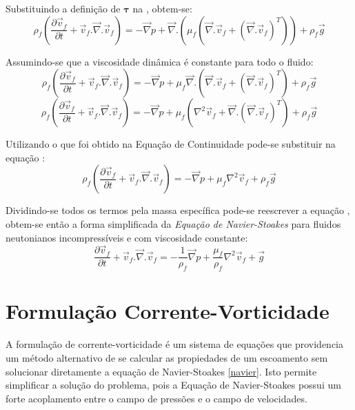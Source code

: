 Substituindo a definição de $\boldsymbol{\tau}$ na , obtem-se:
\begin{equation}
    \rho_f \left(
    	\dfrac{\partial \vec{v}_f}{\partial t} + 
    	\vec{v}_f.\vec{\nabla}.\vec{v}_f
	\right) =
    -\vec{\nabla}p +
    \vec{\nabla}.\left(\mu_f\left(\vec{\nabla}.\vec{v}_f + \left(\vec{\nabla}.\vec{v}_f \right)^T \right)\right) +
    \rho_f \vec{g}
\end{equation}

Assumindo-se que a viscosidade dinâmica é constante para todo o fluido:
\begin{equation}
    \rho_f \left(
    	\dfrac{\partial \vec{v}_f}{\partial t} + 
    	\vec{v}_f.\vec{\nabla}.\vec{v}_f
	\right) =
    -\vec{\nabla}p +
    \mu_f \vec{\nabla}.\left(\vec{\nabla}.\vec{v}_f + \left(\vec{\nabla}.\vec{v}_f \right)^T \right) +
    \rho_f \vec{g}
\end{equation}
\begin{equation}
    \rho_f \left(
    	\dfrac{\partial \vec{v}_f}{\partial t} + 
    	\vec{v}_f.\vec{\nabla}.\vec{v}_f
	\right) =
    -\vec{\nabla}p +
    \mu_f \left(\nabla^2\vec{v}_f + \vec{\nabla}.\left(\vec{\nabla}.\vec{v}_f \right)^T \right) +
    \rho_f \vec{g}
    \label{tau_last}
\end{equation}

Utilizando o que foi obtido na Equação de Continuidade  pode-se substituir na equação :
\begin{equation}
    \rho_f \left(
    	\dfrac{\partial \vec{v}_f}{\partial t} + 
    	\vec{v}_f.\vec{\nabla}.\vec{v}_f
	\right) =
    -\vec{\nabla}p +
    \mu_f \nabla^2\vec{v}_f +
    \rho_f \vec{g}
    \label{tau_simple}
\end{equation}

Dividindo-se todos os termos pela massa específica pode-se reescrever a equação , obtem-se então a forma simplificada da \textit{Equação de Navier-Stoakes} para fluidos neutonianos incompressíveis e com viscosidade constante:
\begin{equation}
	\dfrac{\partial \vec{v}_f}{\partial t} + 
	\vec{v}_f.\vec{\nabla}.\vec{v}_f =
    -\dfrac{1}{\rho_f} \vec{\nabla}p +
    \dfrac{\mu_f}{\rho_f} \nabla^2\vec{v}_f +
    \vec{g}
    \label{navier}
\end{equation}

\section{\textbf{Formulação Corrente-Vorticidade}}
\label{sec_corr_vort}
A formulação de corrente-vorticidade é um sistema de equações que providencia um método alternativo de se calcular as propiedades de um escoamento sem solucionar diretamente a equação de Navier-Stoakes \eqref{navier}.
Isto permite simplificar a solução do problema, pois a Equação de Navier-Stoakes possui um forte acoplamento entre o campo de pressões e o campo de velocidades.

